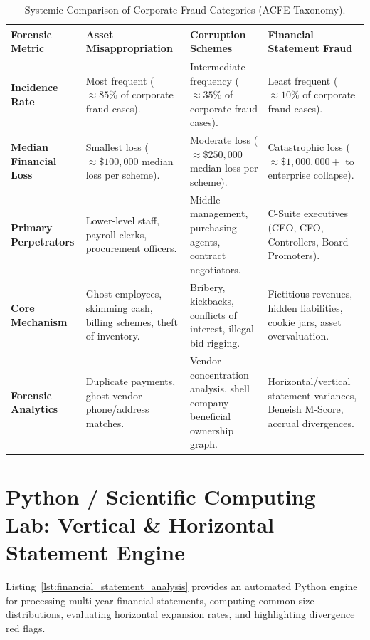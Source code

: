 \begin{table}[htbp]
\centering
\small
\begin{tabularx}{\textwidth}{lXXX}
\toprule
\textbf{Forensic Metric} & \textbf{Asset Misappropriation} & \textbf{Corruption Schemes} & \textbf{Financial Statement Fraud} \\
\midrule
\textbf{Incidence Rate} & Most frequent ($\approx 85\%$ of corporate fraud cases). & Intermediate frequency ($\approx 35\%$ of corporate fraud cases). & Least frequent ($\approx 10\%$ of corporate fraud cases). \\
\addlinespace
\textbf{Median Financial Loss} & Smallest loss ($\approx \$100{,}000$ median loss per scheme). & Moderate loss ($\approx \$250{,}000$ median loss per scheme). & Catastrophic loss ($\approx \$1{,}000{,}000+$ to enterprise collapse). \\
\addlinespace
\textbf{Primary Perpetrators} & Lower-level staff, payroll clerks, procurement officers. & Middle management, purchasing agents, contract negotiators. & C-Suite executives (CEO, CFO, Controllers, Board Promoters). \\
\addlinespace
\textbf{Core Mechanism} & Ghost employees, skimming cash, billing schemes, theft of inventory. & Bribery, kickbacks, conflicts of interest, illegal bid rigging. & Fictitious revenues, hidden liabilities, cookie jars, asset overvaluation. \\
\addlinespace
\textbf{Forensic Analytics} & Duplicate payments, ghost vendor phone/address matches. & Vendor concentration analysis, shell company beneficial ownership graph. & Horizontal/vertical statement variances, Beneish M-Score, accrual divergences. \\
\bottomrule
\end{tabularx}
\caption{Systemic Comparison of Corporate Fraud Categories (ACFE Taxonomy).}
\label{tab:comparison_fraud_categories}
\end{table}

\section{Python / Scientific Computing Lab: Vertical \& Horizontal Statement Engine}

Listing~\ref{lst:financial_statement_analysis} provides an automated Python engine for processing multi-year financial statements, computing common-size distributions, evaluating horizontal expansion rates, and highlighting divergence red flags.

